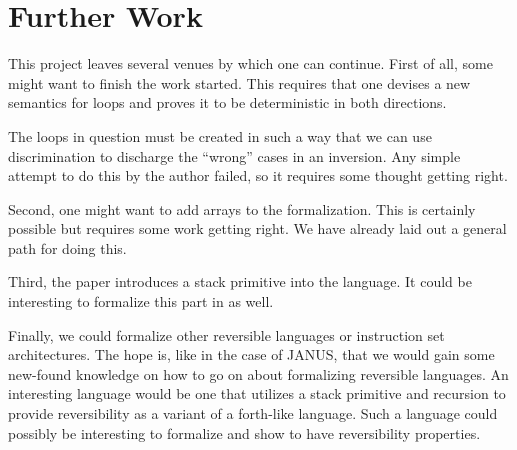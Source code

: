 \chapter{Further Work}

This project leaves several venues by which one can continue. First of
all, some might want to finish the work started. This requires that
one devises a new semantics for loops and proves it to be
deterministic in both directions.

The loops in question must be created in such a way that we can use
discrimination to discharge the ``wrong'' cases in an inversion. Any
simple attempt to do this by the author failed, so it requires some
thought getting right.

Second, one might want to add arrays to the formalization. This is
certainly possible but requires some work getting right. We have
already laid out a general path for doing this.

Third, the paper \cite{glueck+2008} introduces a stack primitive into
the language. It could be interesting to formalize this part in \coq{}
as well.

Finally, we could formalize other reversible languages or instruction
set architectures. The hope is, like in the case of JANUS, that we
would gain some new-found knowledge on how to go on about formalizing
reversible languages. An interesting language would be one that
utilizes a stack primitive and recursion to provide reversibility as a
variant of a forth-like language. Such a language could possibly be
interesting to formalize and show to have reversibility properties.

